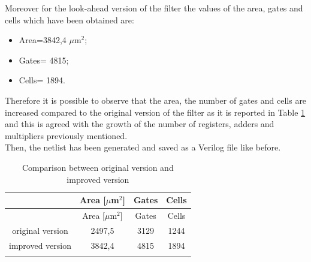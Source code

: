 \documentclass[a4paper, titlepage]{article}
\begin{document}
\newpage 
\noindent
Moreover for the look-ahead version of the filter the values of the area, gates and cells which have been obtained are:
\begin{itemize}
    \item Area=3842,4 $\mu$m$^2$;
    \item Gates= 4815;
    \item Cells= 1894.
\end{itemize}
Therefore it is possible to observe that the area, the number of gates and cells are increased compared to the original version of the filter as it is reported in Table \ref{tab:comparison area} and this is agreed with the growth of the number of registers, adders and multipliers previously mentioned.\\Then, the netlist has been generated and saved as a Verilog file like before.
\begin{longtable}{*4c}
\caption{Comparison between original version and improved version}
\label{tab:comparison area}\\
\toprule
 & Area [$\mu$m$^2$] & Gates & Cells\\
\midrule
\endfirsthead
 & Area [$\mu$m$^2$] & Gates & Cells\\
\midrule
\endhead
\midrule
\endfoot
original version & 2497,5 & 3129 & 1244 \\
improved version & 3842,4 & 4815 & 1894\\
\bottomrule
\endlastfoot
\end{longtable}
\end{document}
